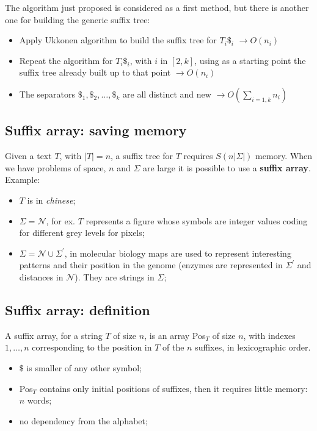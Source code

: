 The algorithm just proposed is considered as a first method, but there is another one for building the generic suffix tree:

\begin{itemize}
	\item Apply Ukkonen algorithm to build the suffix tree for $T_i\$_i$ $ \rightarrow O(n_i)$
	\item Repeat the algorithm for $T_i\$_i$, with $i$ in $[2,k]$, using as a starting point the suffix tree already built up to that point $ \rightarrow O(n_i)$
	
	\item The separators $\$_1, \$_2,\dots,\$_k$ are all distinct and new $ \rightarrow O(\sum_{i = 1,k}n_i)$
\end{itemize}	
	



\subsection{Suffix array: saving memory}
Given a text $T$, with $|T| = n$, a suffix tree for $T$ requires $S(n|\Sigma|)$ memory. When we have problems of space, $n$ and $\Sigma$ are large it is possible to use a \textbf{suffix array}.\\
Example:\\
\begin{itemize}
	\item $T$ is in \textit{chinese};
	\item $\Sigma = \mathcal{N}$, for ex. $T$ represents a figure whose symbols are integer values coding for different grey levels for pixels;
	\item $\Sigma = \mathcal{N} \cup \Sigma^\prime$, in molecular biology maps are used to represent interesting patterns and their position in the genome (enzymes are represented in $\Sigma^\prime$ and distances in $\mathcal{N}$). They are strings in $\Sigma$;
\end{itemize}

\subsection{Suffix array: definition}
A suffix array, for a string $T$ of size $n$, is an array Pos$_T$ of size $n$, with indexes $1,\dots,n$ corresponding to the position in $T$ of the $n$ suffixes, in lexicographic order.
\begin{itemize}
	\item $\$$ is smaller of any other symbol;
	\item Pos$_T$ contains only initial positions of suffixes, then it requires little memory: $n$ words;
	\item no dependency from the alphabet;
\end{itemize}

